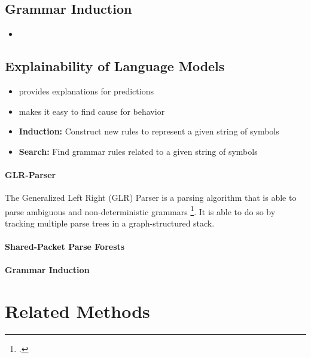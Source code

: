 \subsection{Grammar Induction}
\begin{itemize}
    \item
\end{itemize}
\subsection{Explainability of Language Models}
\begin{itemize}
    \item provides explanations for predictions
    \item makes it easy to find cause for behavior
\end{itemize}

\begin{itemize}
    \item \textbf{Induction:} Construct new rules to represent a given string of symbols
    \item \textbf{Search:} Find grammar rules related to a given string of symbols
\end{itemize}


\paragraph{GLR-Parser}
The Generalized Left Right (GLR) Parser is a parsing algorithm that is able to parse 
ambiguous
and non-deterministic grammars \footcite{lang1974deterministic}. It is able to do so by tracking multiple parse trees in a graph-structured stack.

\paragraph{Shared-Packet Parse Forests}

\paragraph{Grammar Induction}

\section{Related Methods}

